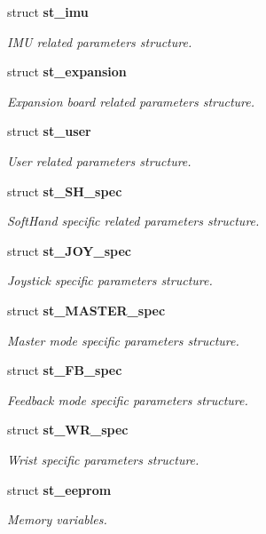 \begin{DoxyCompactItemize}
struct \textbf{ st\+\_\+imu}
\begin{DoxyCompactList}\small\item\em I\+MU related parameters structure. \end{DoxyCompactList}\item 
struct \textbf{ st\+\_\+expansion}
\begin{DoxyCompactList}\small\item\em Expansion board related parameters structure. \end{DoxyCompactList}\item 
struct \textbf{ st\+\_\+user}
\begin{DoxyCompactList}\small\item\em User related parameters structure. \end{DoxyCompactList}\item 
struct \textbf{ st\+\_\+\+S\+H\+\_\+spec}
\begin{DoxyCompactList}\small\item\em Soft\+Hand specific related parameters structure. \end{DoxyCompactList}\item 
struct \textbf{ st\+\_\+\+J\+O\+Y\+\_\+spec}
\begin{DoxyCompactList}\small\item\em Joystick specific parameters structure. \end{DoxyCompactList}\item 
struct \textbf{ st\+\_\+\+M\+A\+S\+T\+E\+R\+\_\+spec}
\begin{DoxyCompactList}\small\item\em Master mode specific parameters structure. \end{DoxyCompactList}\item 
struct \textbf{ st\+\_\+\+F\+B\+\_\+spec}
\begin{DoxyCompactList}\small\item\em Feedback mode specific parameters structure. \end{DoxyCompactList}\item 
struct \textbf{ st\+\_\+\+W\+R\+\_\+spec}
\begin{DoxyCompactList}\small\item\em Wrist specific parameters structure. \end{DoxyCompactList}\item 
struct \textbf{ st\+\_\+eeprom}
\begin{DoxyCompactList}\small\item\em Memory variables. \end{DoxyCompactList}\item 

\end{DoxyCompactItemize}
